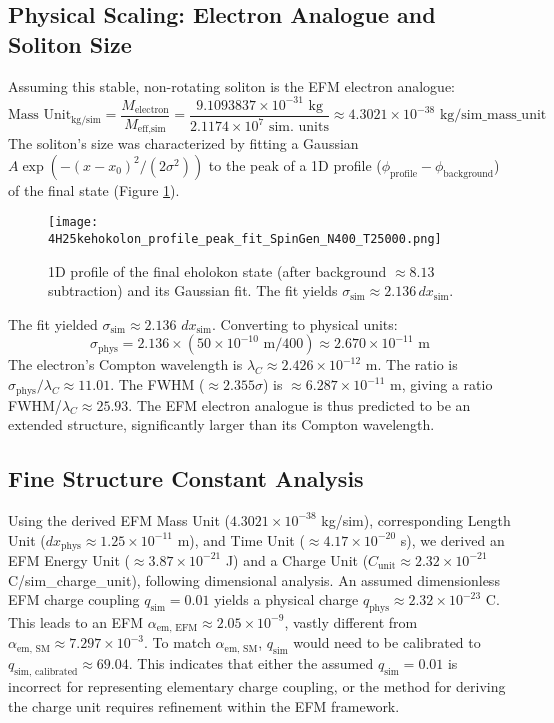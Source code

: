 \documentclass[11pt]{article}
\begin{document}
\subsection{Physical Scaling: Electron Analogue and Soliton Size}
Assuming this stable, non-rotating soliton is the EFM electron analogue:
\[
\text{Mass Unit}_{\text{kg/sim}} = \frac{M_{\text{electron}}}{M_{\text{eff,sim}}} = \frac{9.1093837 \times 10^{-31} \text{ kg}}{2.1174 \times 10^7 \text{ sim. units}} \approx 4.3021 \times 10^{-38} \text{ kg/sim\_mass\_unit}
\]
The soliton's size was characterized by fitting a Gaussian \(A \exp(-(x-x_0)^2 / (2\sigma^2))\) to the peak of a 1D profile (\(\phi_{\text{profile}} - \phi_{\text{background}}\)) of the final state (Figure \ref{fig:ehokolon_profile_fit_N400}).
\begin{figure}[htbp]
    \centering
    \texttt{[image: 4H25kehokolon\_profile\_peak\_fit\_SpinGen\_N400\_T25000.png]}
    \caption{1D profile of the final eholokon state (after background \(\approx 8.13\) subtraction) and its Gaussian fit. The fit yields \(\sigma_{\text{sim}} \approx 2.136 \, dx_{\text{sim}}\).}
    \label{fig:ehokolon_profile_fit_N400}
\end{figure}
The fit yielded \(\sigma_{\text{sim}} \approx 2.136\) \(dx_{\text{sim}}\). Converting to physical units:
\[
\sigma_{\text{phys}} = 2.136 \times (50 \times 10^{-10} \text{ m} / 400) \approx 2.670 \times 10^{-11} \text{ m}
\]
The electron's Compton wavelength is \(\lambda_C \approx 2.426 \times 10^{-12}\) m. The ratio is \(\sigma_{\text{phys}} / \lambda_C \approx 11.01\). The FWHM (\(\approx 2.355\sigma\)) is \(\approx 6.287 \times 10^{-11}\) m, giving a ratio FWHM/\(\lambda_C \approx 25.93\). The EFM electron analogue is thus predicted to be an extended structure, significantly larger than its Compton wavelength.

\subsection{Fine Structure Constant Analysis}
Using the derived EFM Mass Unit (\(4.3021 \times 10^{-38}\) kg/sim), corresponding Length Unit (\(dx_{\text{phys}} \approx 1.25 \times 10^{-11}\) m), and Time Unit (\(\approx 4.17 \times 10^{-20}\) s), we derived an EFM Energy Unit (\(\approx 3.87 \times 10^{-21}\) J) and a Charge Unit (\(C_{\text{unit}} \approx 2.32 \times 10^{-21}\) C/sim\_charge\_unit), following dimensional analysis. An assumed dimensionless EFM charge coupling \(q_{\text{sim}} = 0.01\) yields a physical charge \(q_{\text{phys}} \approx 2.32 \times 10^{-23}\) C. This leads to an EFM \(\alpha_{\text{em, EFM}} \approx 2.05 \times 10^{-9}\), vastly different from \(\alpha_{\text{em, SM}} \approx 7.297 \times 10^{-3}\).
To match \(\alpha_{\text{em, SM}}\), \(q_{\text{sim}}\) would need to be calibrated to \(q_{\text{sim, calibrated}} \approx 69.04\). This indicates that either the assumed \(q_{\text{sim}}=0.01\) is incorrect for representing elementary charge coupling, or the method for deriving the charge unit requires refinement within the EFM framework.
\end{document}
